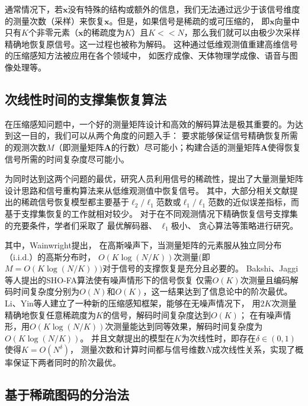 \documentclass[AutoFakeBold]{LZUThesis}
\begin{document}
通常情况下，若$\mathbf{x}$没有特殊的结构或额外的信息，我们无法通过远少于该信号维度的测量次数（采样）来恢复$\mathbf{x}$。但是，如果信号是稀疏的或可压缩的，
即$\mathbf{x}$向量中只有$K$个非零元素（$\mathbf{x}$的稀疏度为$K$）且$K << N$，那么我们就可以由极少次采样精确地恢复原信号。这一过程也被称为解码。
这种通过低维观测值重建高维信号的压缩感知方法被应用在各个领域中，
如医疗成像\cite{PMID:17969013}、天体物理学成像\cite{Wiaux_2009}、语音与图像处理\cite{elad2010sparse}等。

\subsection{次线性时间的支撑集恢复算法}

在压缩感知问题中，一个好的测量矩阵设计和高效的解码算法是极其重要的。为达到这一目的，我们可以从两个角度的问题入手：
要求能够保证信号精确恢复所需的观测次数$M$（即测量矩阵$\mathbf{A}$的行数）尽可能小；构建合适的测量矩阵$\mathbf{A}$使得恢复信号所需的时间复杂度尽可能小。

为同时达到这两个问题的最优，研究人员利用信号的稀疏性，提出了大量测量矩阵设计思路和信号重构算法来从低维观测值中恢复信号。
其中，大部分相关文献提出的稀疏信号恢复模型都主要基于$\ell_2 / \ell_1$范数或$\ell_1 / \ell_1$范数的近似误差指标，而基于支撑集恢复\cite{gilbert2010sparse}的工作就相对较少。
对于在不同观测情况下精确恢复信号支撑集的充要条件，学者们采取了
最优解码器\cite{861970, wainwright2007informationtheoretic}、
$\ell_1$极小\cite{10.1214/08-AOS653}、
贪心算法\cite{5895106}等策略进行研究。

其中，Wainwright\cite{wainwright2007informationtheoretic}提出，
在高斯噪声下，当测量矩阵的元素服从独立同分布（i.i.d.）的高斯分布时，
$O(K \log(N/K))$次测量(即$M = O(K \log(N/K)))$对于信号的支撑恢复是充分且必要的。
Bakshi、Jaggi\cite{7185441}等人提出的SHO-FA算法使有噪声情形下的信号恢复
仅需$O(K)$次测量且编码解码时间复杂度分别为$O(N)$和$O(K)$，这一结果达到了信息论中的阶次最优。
Li、Yin\cite{8733902}等人建立了一种新的压缩感知框架，能够在无噪声情况下，
用$2K$次测量精确地恢复任意稀疏度为$K$的信号，解码时间复杂度达到$O(K)$；
在有噪声情形，用$O(K \log(N/K))$次测量能达到同等效果，解码时间复杂度为$O(K \log(N/K))$。
并且文献\cite{8733902}提出的模型在$K$为次线性时，即存在$\delta \in (0,1)$使得$K = O(N^\delta)$，
测量次数和计算时间都与信号维数$N$成次线性关系，实现了概率保证下两者同时的阶次最优。

\subsection{基于稀疏图码的分治法}
\label{d_n_c}
\end{document}
